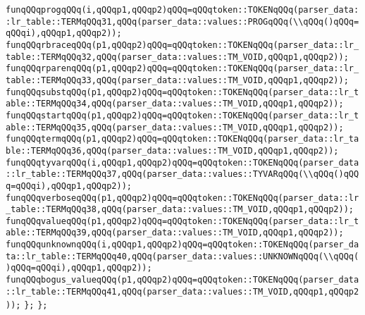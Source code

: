 \verb|funqQQqprogqQQq(i,qQQqp1,qQQqp2)qQQq=qQQqtoken::TOKENqQQq(parser_data::lr_table::TERMqQQq31,qQQq(parser_data::values::PROGqQQq(\\qQQq()qQQq=qQQqi),qQQqp1,qQQqp2));|\newline
\verb|funqQQqrbraceqQQq(p1,qQQqp2)qQQq=qQQqtoken::TOKENqQQq(parser_data::lr_table::TERMqQQq32,qQQq(parser_data::values::TM_VOID,qQQqp1,qQQqp2));|\newline
\verb|funqQQqrparenqQQq(p1,qQQqp2)qQQq=qQQqtoken::TOKENqQQq(parser_data::lr_table::TERMqQQq33,qQQq(parser_data::values::TM_VOID,qQQqp1,qQQqp2));|\newline
\verb|funqQQqsubstqQQq(p1,qQQqp2)qQQq=qQQqtoken::TOKENqQQq(parser_data::lr_table::TERMqQQq34,qQQq(parser_data::values::TM_VOID,qQQqp1,qQQqp2));|\newline
\verb|funqQQqstartqQQq(p1,qQQqp2)qQQq=qQQqtoken::TOKENqQQq(parser_data::lr_table::TERMqQQq35,qQQq(parser_data::values::TM_VOID,qQQqp1,qQQqp2));|\newline
\verb|funqQQqtermqQQq(p1,qQQqp2)qQQq=qQQqtoken::TOKENqQQq(parser_data::lr_table::TERMqQQq36,qQQq(parser_data::values::TM_VOID,qQQqp1,qQQqp2));|\newline
\verb|funqQQqtyvarqQQq(i,qQQqp1,qQQqp2)qQQq=qQQqtoken::TOKENqQQq(parser_data::lr_table::TERMqQQq37,qQQq(parser_data::values::TYVARqQQq(\\qQQq()qQQq=qQQqi),qQQqp1,qQQqp2));|\newline
\verb|funqQQqverboseqQQq(p1,qQQqp2)qQQq=qQQqtoken::TOKENqQQq(parser_data::lr_table::TERMqQQq38,qQQq(parser_data::values::TM_VOID,qQQqp1,qQQqp2));|\newline
\verb|funqQQqvalueqQQq(p1,qQQqp2)qQQq=qQQqtoken::TOKENqQQq(parser_data::lr_table::TERMqQQq39,qQQq(parser_data::values::TM_VOID,qQQqp1,qQQqp2));|\newline
\verb|funqQQqunknownqQQq(i,qQQqp1,qQQqp2)qQQq=qQQqtoken::TOKENqQQq(parser_data::lr_table::TERMqQQq40,qQQq(parser_data::values::UNKNOWNqQQq(\\qQQq()qQQq=qQQqi),qQQqp1,qQQqp2));|\newline
\verb|funqQQqbogus_valueqQQq(p1,qQQqp2)qQQq=qQQqtoken::TOKENqQQq(parser_data::lr_table::TERMqQQq41,qQQq(parser_data::values::TM_VOID,qQQqp1,qQQqp2));|\newline
\verb|};|\newline
\verb|};|\newline

